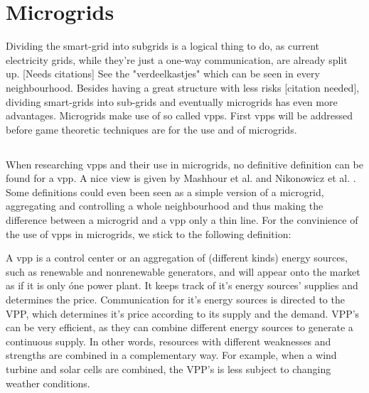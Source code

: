 \section{Microgrids }
Dividing the smart-grid into subgrids is a logical thing to do, as current electricity grids, while they're just a one-way communication, are already split up. [Needs citations] See the "verdeelkastjes" which can be seen in every neighbourhood. Besides having a great structure with less risks [citation needed], dividing smart-grids into sub-grids and eventually microgrids  has even more advantages.  Microgrids make use of so called \glspl{vpp}. First \glspl{vpp} will be addressed before game theoretic techniques are  for the use and  of microgrids. 

\subsection{}
When researching \glspl{vpp} and their use in microgrids, no definitive definition can be found for a \gls{vpp}. A nice view is given by Mashhour et al. \cite{MashhourMoghaddas-Tafreshi2011} and Nikonowicz et al. \cite{NikonowiczMilewski2012}. Some definitions could even been seen as a simple version of a microgrid, aggregating and controlling a whole neighbourhood \cite{Kumagai2012} and thus making the difference between a microgrid and a \gls{vpp} only a thin line. For the convinience of the use of \glspl{vpp} in microgrids, we stick to the following definition:

A \gls{vpp} is a control center or an aggregation of (different kinds) energy sources, such as renewable and nonrenewable generators, and will appear onto the market as if it is only \'one power plant. It keeps track of it's energy sources' supplies and determines the price. Communication for it's energy sources is directed to the VPP, which determines it's price according to its supply and the demand. VPP's can be very efficient, as they can combine different energy sources to generate a continuous supply. In other words, resources with different weaknesses and strengths are combined in a complementary way\cite{Koeppel2003}. For example, when a wind turbine and solar cells are combined, the VPP's is less subject to  changing weather conditions. \cite{Tromly2001}\cite{Kumagai2012}\cite{MashhourMoghaddas-Tafreshi2011}\cite{NikonowiczMilewski2012}

